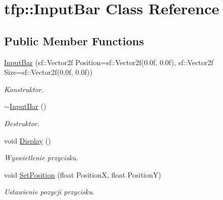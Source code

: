 \hypertarget{classtfp_1_1_input_bar}{}\section{tfp\+:\+:Input\+Bar Class Reference}
\label{classtfp_1_1_input_bar}
\subsection*{Public Member Functions}
\begin{DoxyCompactItemize}
\item 
\mbox{\label{classtfp_1_1_input_bar_a520d9705d0408374ddde94b2af51dd9e}} 
\mbox{\hyperlink{classtfp_1_1_input_bar_a520d9705d0408374ddde94b2af51dd9e}{Input\+Bar}} (sf\+::\+Vector2f Position=sf\+::\+Vector2f(0.\+0f, 0.\+0f), sf\+::\+Vector2f Size=sf\+::\+Vector2f(0.\+0f, 0.\+0f))
\begin{DoxyCompactList}\small\item\em Konstruktor. \end{DoxyCompactList}\item 
\mbox{\label{classtfp_1_1_input_bar_aed85e7753d5c8dfd6eb66f34225774e8}} 
\mbox{\hyperlink{classtfp_1_1_input_bar_aed85e7753d5c8dfd6eb66f34225774e8}{$\sim$\+Input\+Bar}} ()
\begin{DoxyCompactList}\small\item\em Destruktor. \end{DoxyCompactList}\item 
void \mbox{\hyperlink{classtfp_1_1_input_bar_a1ca3dc45cea59e824be74286f02faf91}{Display}} ()
\begin{DoxyCompactList}\small\item\em Wyswietlenie przycisku. \end{DoxyCompactList}\item 
\mbox{\label{classtfp_1_1_input_bar_a64c38ca4945ce149f716f63af9edbe2f}} 
void \mbox{\hyperlink{classtfp_1_1_input_bar_a64c38ca4945ce149f716f63af9edbe2f}{Set\+Position}} (float PositionX, float PositionY)
\begin{DoxyCompactList}\small\item\em Ustawienie pozycji przycisku. \end{DoxyCompactList}\item 
\mbox{\label{classtfp_1_1_input_bar_af1da05af9e1a0275794db4e3da118117}} 

\end{DoxyCompactItemize}
